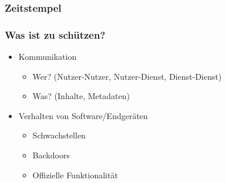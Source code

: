 \documentclass[12pt]{beamer}
\begin{document}
\begin{frame}
    \frametitle{Zeitstempel}
    \begin{center}


    \end{center}
\end{frame}

\begin{frame}
  \frametitle{Was ist zu schützen?}
  \begin{itemize}
    \item<1-> Kommunikation 
    \begin{itemize}
      \item<1-> Wer? (Nutzer-Nutzer, Nutzer-Dienst, Dienst-Dienst)
      \item<1-> Was? (Inhalte, Metadaten)
    \end{itemize}
  \item<1-> Verhalten von Software/Endgeräten
    \begin{itemize}
      \item<2-> Schwachstellen
      \item<3-> Backdoors
      \item<4-> Offizielle Funktionalität
    \end{itemize}
  \end{itemize}
\end{frame}
\end{document}
